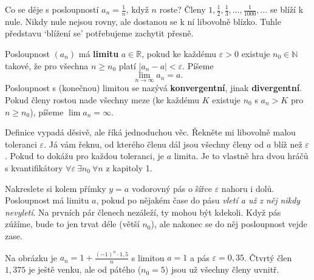 Co se děje s posloupností $a_n = \frac{1}{n}$, když $n$ roste? Členy $1, \frac{1}{2}, \frac{1}{3}, \ldots, \frac{1}{1000}, \ldots$ se blíží k nule. Nikdy nule nejsou rovny, ale dostanou se k ní libovolně blízko. Tuhle představu `blížení se' potřebujeme zachytit přesně.

\begin{definitionbox}
  Posloupnost $(a_n)$ má \textbf{limitu} $a\in\mathbb{R}$, pokud ke každému $\varepsilon > 0$ existuje $n_0\in\mathbb{N}$ takové, že pro všechna $n\geq n_0$ platí $|a_n - a| < \varepsilon$. Píšeme
  \begin{equation*}
    \lim_{n\to\infty} a_n = a.
  \end{equation*}
  Posloupnost s (konečnou) limitou se nazývá \textbf{konvergentní}, jinak \textbf{divergentní}. Pokud členy rostou nade všechny meze (ke každému $K$ existuje $n_0$ s $a_n > K$ pro $n\geq n_0$), píšeme $\lim a_n = \infty$.
\end{definitionbox}

Definice vypadá děsivě, ale říká jednoduchou věc. Řekněte mi libovolně malou toleranci $\varepsilon$. Já vám řeknu, od kterého členu dál jsou všechny členy od $a$ blíž než $\varepsilon$. Pokud to dokážu pro každou toleranci, je $a$ limita. Je to vlastně hra dvou hráčů s kvantifikátory $\forall\varepsilon\ \exists n_0\ \forall n$ z kapitoly 1.

Nakreslete si kolem přímky $y = a$ vodorovný pás o šířce $\varepsilon$ nahoru i dolů. Posloupnost má limitu $a$, pokud po nějakém čase do pásu \textit{vletí a už z něj nikdy nevyletí}. Na prvních pár členech nezáleží, ty mohou být kdekoli. Když pás zúžíme, bude to jen trvat déle (větší $n_0$), ale nakonec se do něj posloupnost vejde zase.

\begin{center}
\end{center}
Na obrázku je $a_n = 1 + \frac{{(-1)}^n\cdot 1{,}5}{n}$ s limitou $a = 1$ a pás $\varepsilon = 0{,}35$. Čtvrtý člen $1{,}375$ je ještě venku, ale od pátého ($n_0 = 5$) jsou už všechny členy uvnitř.

